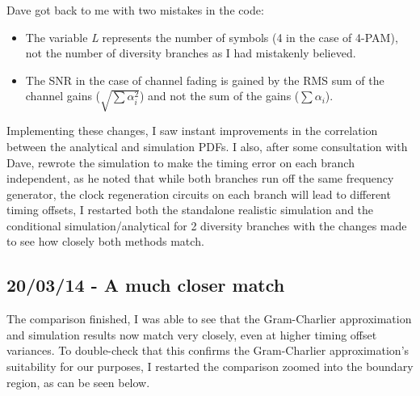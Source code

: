 Dave got back to me with two mistakes in the code:

\begin{itemize}
\itemsep1pt\parskip0pt
\item
  The variable \emph{L} represents the number of symbols (4 in the case
  of 4-PAM), not the number of diversity branches as I had mistakenly
  believed.
\item
  The SNR in the case of channel fading is gained by the RMS sum of the
  channel gains ($\sqrt{\sum \alpha_i^2}$) and not the sum of the gains
  ($\sum \alpha_i$).
\end{itemize}

Implementing these changes, I saw instant improvements in the
correlation between the analytical and simulation PDFs. I also, after
some consultation with Dave, rewrote the simulation to make the timing
error on each branch independent, as he noted that while both branches
run off the same frequency generator, the clock regeneration circuits on
each branch will lead to different timing offsets, I restarted both the
standalone realistic simulation and the conditional
simulation/analytical for 2 diversity branches with the changes made to
see how closely both methods match.

\subsection{20/03/14 - A much closer match}

The comparison finished, I was able to see that the Gram-Charlier
approximation and simulation results now match very closely, even at
higher timing offset variances. To double-check that this confirms the
Gram-Charlier approximation's suitability for our purposes, I restarted
the comparison zoomed into the boundary region, as can be seen below.

